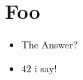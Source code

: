 {
\tableofcontents
}

\section{Foo}
{
\begin{itemize}
\item The Answer?
\item $42$ i say!
\end{itemize}

}
